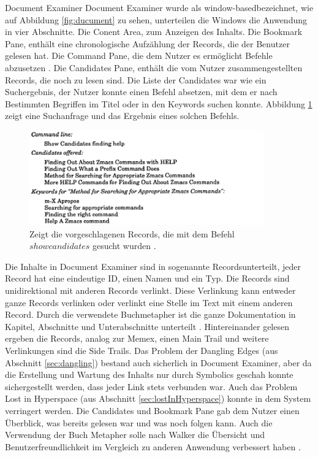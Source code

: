 \begin{section}{Document Examiner}
Document Examiner wurde als \glqq window-based\grqq{ }bezeichnet, wie auf Abbildung \ref{fig:ducument} zu sehen, unterteilen die Windows die Anwendung in vier Abschnitte. Die Conent Area, zum Anzeigen des Inhalts. Die Bookmark Pane, enthält eine chronologische Aufzählung der Records, die der Benutzer gelesen hat. Die Command Pane, die dem Nutzer es ermöglicht Befehle abzusetzen \cite{Walker1987}. Die Candidates Pane, enthält die vom Nutzer zusammengestellten Records, die noch zu lesen sind. Die Liste der Candidates war wie ein Suchergebnis, der Nutzer konnte einen Befehl absetzen, mit dem er nach Bestimmten Begriffen im Titel oder in den Keywords suchen konnte. Abbildung \ref{fig:candidates} zeigt eine Suchanfrage und das Ergebnis eines solchen Befehls.

\begin{figure}[H]
	\centering
	\includegraphics[width=0.9\textwidth]{image/candidates}
	\caption{Zeigt die vorgeschlagenen Records, die mit dem Befehl $show candidates$ gesucht wurden \cite{Walker1987}.}
	\label{fig:candidates}
\end{figure}

Die Inhalte in Document Examiner sind in sogenannte \glqq Records\grqq{ }unterteilt, jeder Record hat eine eindeutige ID, einen Namen und ein Typ. Die Records sind unidirektional mit anderen Records verlinkt. Diese Verlinkung kann entweder ganze Records verlinken oder verlinkt eine Stelle im Text mit einem anderen Record. Durch die verwendete Buchmetapher ist die ganze Dokumentation in Kapitel, Abschnitte und Unterabschnitte unterteilt \cite{Walker1987}. Hintereinander gelesen ergeben die Records, analog zur Memex, einen Main Trail und weitere Verlinkungen sind die Side Trails. Das Problem der Dangling Edges (aus Abschnitt \ref{sec:dangling}) bestand auch sicherlich in Document Examiner, aber da die Erstellung und Wartung des Inhalts nur durch Symbolics geschah \cite{Walker1987} konnte sichergestellt werden, dass jeder Link stets verbunden war. Auch das Problem Lost in Hyperspace (aus Abschnitt \ref{sec:lostInHyperspace}) konnte in dem System verringert werden. Die Candidates und Bookmark Pane gab dem Nutzer einen Überblick, was bereits gelesen war und was noch folgen kann. Auch die Verwendung der Buch Metapher solle nach Walker die Übersicht und Benutzerfreundlichkeit im Vergleich zu anderen Anwendung verbessert haben \cite{Walker1987}.

\end{section}

